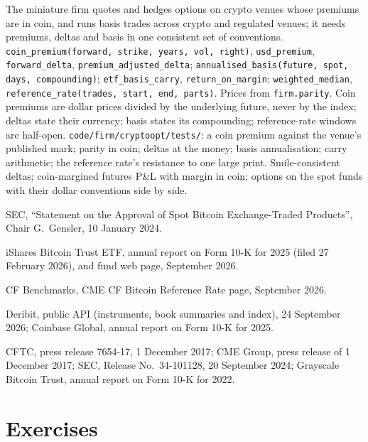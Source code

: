 \begin{build}
 The miniature firm quotes and hedges options on crypto venues whose premiums are in coin, and runs basis trades across
crypto and regulated venues; it needs premiums, deltas and basis in one consistent set of conventions.
 \texttt{coin\_premium(forward, strike, years, vol, right)}, \texttt{usd\_premium}, \texttt{forward\_delta},
\texttt{premium\_adjusted\_delta}; \texttt{annualised\_basis(future, spot, days, compounding)}; \texttt{etf\_basis\_carry},
\texttt{return\_on\_margin}; \texttt{weighted\_median}, \texttt{reference\_rate(trades, start, end, parts)}. Prices from
\texttt{firm.parity}.
 Coin premiums are dollar prices divided by the underlying future, never by the index; deltas state their currency;
basis states its compounding; reference-rate windows are half-open.
 \texttt{code/firm/cryptoopt/tests/}: a coin premium against the venue's published mark; parity in coin; deltas at
the money; basis annualisation; carry arithmetic; the reference rate's resistance to one large print.
 Smile-consistent deltas; coin-margined futures P\&L with margin in coin; options on the spot funds with their dollar
conventions side by side.
\end{build}

\begin{omsources}
\item SEC, ``Statement on the Approval of Spot Bitcoin Exchange-Traded Products'', Chair G.~Gensler, 10 January 2024.
\item iShares Bitcoin Trust ETF, annual report on Form 10-K for 2025 (filed 27 February 2026), and fund web page, September 2026.
\item CF Benchmarks, CME CF Bitcoin Reference Rate page, September 2026.
\item Deribit, public API (instruments, book summaries and index), 24 September 2026; Coinbase Global, annual report on Form 10-K for 2025.
\item CFTC, press release 7654-17, 1 December 2017; CME Group, press release of 1 December 2017; SEC, Release No.\ 34-101128, 20 September 2024;
Grayscale Bitcoin Trust, annual report on Form 10-K for 2022.
\end{omsources}

\section{Exercises}

